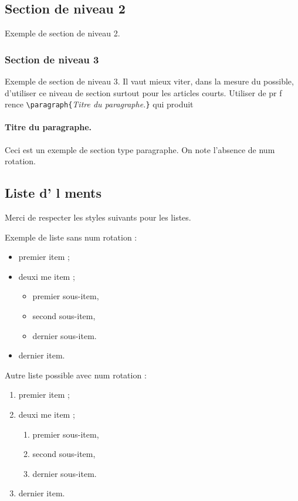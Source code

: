 \documentclass{article}
\begin{document}
\subsection{Section de niveau 2}

Exemple de section de niveau 2.


\subsubsection{Section de niveau 3}

Exemple de section de niveau 3. Il vaut mieux  viter, dans la mesure
du possible, d'utiliser ce niveau de section surtout pour les
articles courts. Utiliser de pr f rence
\verb+\paragraph{+\textit{Titre du paragraphe.}\verb+}+ qui produit

\paragraph{Titre du paragraphe.} Ceci est un exemple de section type
paragraphe. On note l'absence de num rotation.

\subsection{Liste d' l ments}

Merci de respecter les styles suivants pour les listes.

Exemple de liste sans num rotation :
\begin{itemize}
    \item premier item ;
    \item deuxi me item ;
    \begin{itemize}
      \item premier sous-item,
      \item second sous-item,
      \item dernier sous-item.
  \end{itemize}
  \item dernier item.
\end{itemize}

Autre liste possible avec num rotation :
\begin{enumerate}
    \item premier item ;
    \item deuxi me item ;
    \begin{enumerate}
      \item premier sous-item,
      \item second sous-item,
      \item dernier sous-item.
    \end{enumerate}
  \item dernier item.
\end{enumerate}
\end{document}
